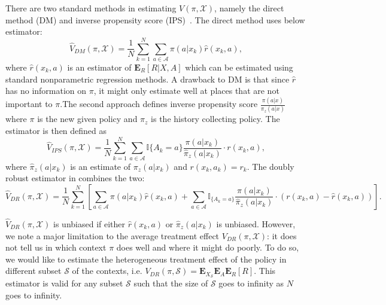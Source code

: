 There are two standard methods in estimating $V(\pi, \mathcal{X})$, namely the direct method (DM) and inverse propensity score (IPS)~\cite{dudik2014doubly}. The direct method uses below estimator:
$$\widehat{V}_{DM}(\pi, \mathcal{X}) = \frac{1}{N}{\sum_{k=1}^N}\sum_{a \in \mathcal{A}} \pi(a|x_k)\hat{r}(x_k, a),$$ where $\hat{r}(x_k, a)$ is an estimator of $\mathbf{E}_{R}[R|X,A]$ which can be estimated using standard nonparametric regression methods. A drawback to DM is that since $\hat{r}$ has no information on $\pi$, it might only estimate well at places that are not important to $\pi$.The second approach defines inverse propensity score $\frac{\pi(a|x)}{\pi_{z}(a|x)}$ where $\pi$ is the new given policy and $\pi_{z}$ is the history collecting policy. The estimator is then defined as
$$\widehat{V}_{IPS} (\pi, \mathcal{X}) = \frac{1}{N}\sum_{k=1}^N \sum_{a \in \mathcal{A}}\mathbb{I}\{A_k = a\} \frac{\pi(a|x_k)}{\hat{\pi}_{z}(a|x_k)} \cdot r(x_k, a),$$ where $\hat{\pi}_{z}(a|x_k)$ is an estimate of $\pi_{z}(a|x_k)$ and $r(x_k, a_k)=r_k$. The doubly robust estimator in \cite{dudik2014doubly} combines the two:
$$\widehat{V}_{DR} (\pi, \mathcal{X}) = \frac{1}{N}\sum_{k=1}^N \left[ \sum_{a \in \mathcal{A}} \pi(a|x_k)\hat{r}(x_k, a) + \sum_{a \in \mathcal{A}} \mathbb{I}_{\{A_k = a\}}\frac{\pi(a|x_k)}{\hat{\pi}_{z}(a|x_k)} \cdot (r(x_k, a) - \hat{r}(x_k, a))\right].$$





$\widehat{V}_{DR} (\pi, \mathcal{X})$ is unbiased if either $\hat{r}(x_k, a)$ or $\hat{\pi}_{z}(a|x_k)$ is unbiased. However, we note a major limitation to the average treatment effect $V_{DR} (\pi, \mathcal{X})$: it does not tell us in which context $\pi$ does well and where it might do poorly. To do so, we would like to estimate the heterogeneous treatment effect of the policy in different subset $\mathcal{S}$ of the contexts, i.e. $V_{DR} (\pi, \mathcal{S})= \mathbf{E}_{X_\mathcal{S}} \mathbf{E}_{A}\mathbf{E}_{R} [R].$ This estimator is valid for any subset $\mathcal{S}$ such that the size of $\mathcal{S}$ goes to infinity as $N$ goes to infinity.
 


